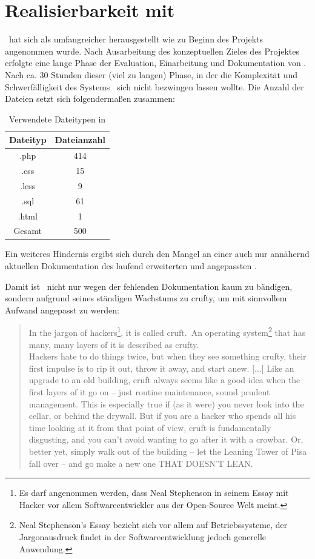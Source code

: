 \section{Realisierbarkeit mit \getOst} \label{Realisierbarkeit mit \getOst}
\getOst\ hat sich als umfangreicher herausgestellt wie zu Beginn des Projekts angenommen wurde. Nach Ausarbeitung des konzeptuellen Zieles des Projektes erfolgte eine lange Phase der Evaluation, Einarbeitung und Dokumentation von \getOst. Nach ca. 30 Stunden dieser (viel zu langen) Phase, in der die Komplexität und Schwerfälligkeit des Systems \getOst\ sich nicht bezwingen lassen wollte. Die Anzahl der Dateien setzt sich folgendermaßen zusammen:

\begin{table}
	\centering
	\begin{tabular}{|c|c|}
		\hline 
		Dateityp	& Dateianzahl \\ 
		\hline 
		.php		& 414 \\ 
		\hline 
		.css		& 15 \\ 
		\hline 
		.less		& 9 \\ 
		\hline 
		.sql		& 61 \\ 
		\hline 
		.html		& 1 \\ 
		\hline
		\hline 
		Gesamt		& 500 \\ 
		\hline 
	\end{tabular}

	\label{tbl_ost_dateianzahl}
	\caption{Verwendete Dateitypen in \getOst}
\end{table}

Ein weiteres Hindernis ergibt sich durch den Mangel an einer auch nur annähernd aktuellen Dokumentation des laufend erweiterten und angepassten \getOst.

Damit ist \getOst\ nicht nur wegen der fehlenden Dokumentation kaum zu bändigen, sondern aufgrund seines ständigen Wachstums zu \glqq crufty\grqq , um mit sinnvollem Aufwand angepasst zu werden:

\blockcquote{cmdlinestephenson}{
	 In the jargon of hackers\footnote{Es darf angenommen werden, dass Neal Stephenson in seinem Essay mit Hacker vor allem Softwareentwickler aus der Open-Source Welt meint.}, it is called
	\glqq cruft.\grqq\ An operating system\footnote{Neal Stephenson's Essay bezieht sich vor allem auf Betriebssysteme, der Jargonausdruck findet in der Softwareentwicklung jedoch generelle Anwendung.} that has many, many layers of it is described as \glqq crufty.\grqq \\
	Hackers hate to do things twice, but when they see something crufty, their first impulse
	is to rip it out, throw it away, and start anew.
	[...]
	Like an upgrade to an old building, cruft always seems like a good idea when the first layers of it go on – just routine maintenance, sound prudent management. This is especially true if (as it were) you never look into the cellar, or behind the drywall. But if you are a hacker who spends all his time looking at it from that point of view, cruft is fundamentally disgusting, and you can’t avoid wanting to go after it with a crowbar. Or, better yet, simply walk out of the building – let the Leaning Tower of Pisa fall over – and go make a new one THAT DOESN’T LEAN.
}

